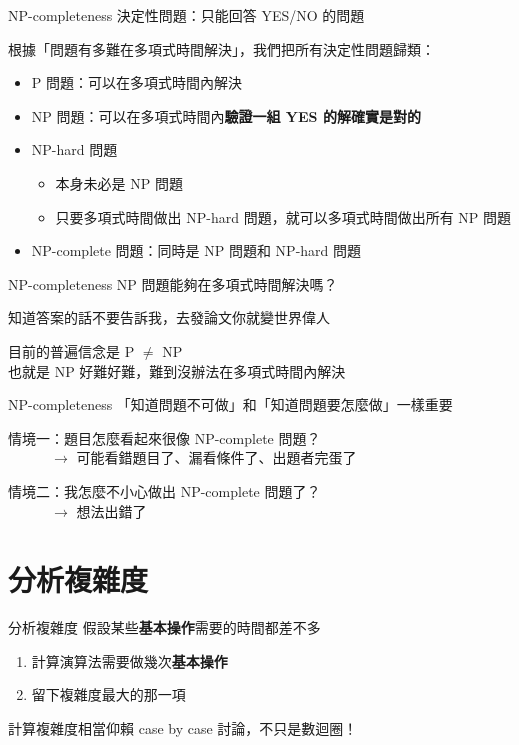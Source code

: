 \documentclass[aspectratio=169]{beamer}
\begin{document}
\begin{frame}{NP-completeness}
  決定性問題：只能回答 YES/NO 的問題

  根據「問題有多難在多項式時間解決」，我們把所有決定性問題歸類：

  \begin{itemize}
    \item P 問題：可以在多項式時間內解決
    \item NP 問題：可以在多項式時間內\textbf{驗證一組 YES 的解確實是對的}
    \item NP-hard 問題
    \begin{itemize}
      \item 本身未必是 NP 問題
      \item 只要多項式時間做出 NP-hard 問題，就可以多項式時間做出所有 NP 問題
    \end{itemize}
    \item NP-complete 問題：同時是 NP 問題和 NP-hard 問題
  \end{itemize}
\end{frame}

\begin{frame}{NP-completeness}
  NP 問題能夠在多項式時間解決嗎？

  知道答案的話不要告訴我，去發論文你就變世界偉人

  目前的普遍信念是 P $\neq$ NP\\
  也就是 NP 好難好難，難到沒辦法在多項式時間內解決
\end{frame}

\begin{frame}{NP-completeness}
  「知道問題不可做」和「知道問題要怎麼做」一樣重要

  情境一：題目怎麼看起來很像 NP-complete 問題？\\
  　　　$\longrightarrow$ 可能看錯題目了、漏看條件了、出題者完蛋了

  情境二：我怎麼不小心做出 NP-complete 問題了？\\
  　　　$\longrightarrow$ 想法出錯了
\end{frame}


\section{分析複雜度}

\begin{frame}{分析複雜度}
  假設某些\textbf{基本操作}需要的時間都差不多

  \begin{enumerate}
    \item 計算演算法需要做幾次\textbf{基本操作}
    \item 留下複雜度最大的那一項
  \end{enumerate}

  計算複雜度相當仰賴 case by case 討論，不只是數迴圈！
\end{frame}
\end{document}
